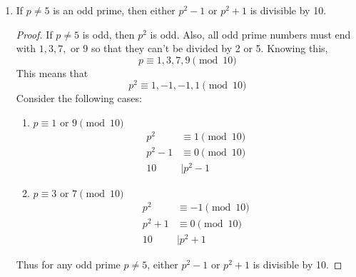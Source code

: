 \documentclass[11pt]{article}
\begin{document}
\begin{enumerate}
\begin{enumerate}
        \item If $p\neq 5$ is an odd prime, then either $p^2-1$ or $p^2 + 1$ is
        divisible by 10.
        \begin{proof}
            If $p\neq 5$ is odd, then $p^2$ is odd. Also, all odd prime numbers must 
            end with $1,3,7,$ or $9$ so that they can't be divided by 2 or 5.
            Knowing this, 
            \[
                p \equiv 1,3,7,9 \pmod{10}
            \]
            This means that
            \[
                p^2 \equiv 1,-1,-1,1 \pmod{10}
            \]
            Consider the following cases:
            \begin{enumerate}
                \item $p\equiv 1 \text{ or }9 \pmod{10}$
                \begin{align*}
                    p^2 &\equiv 1 \pmod{10} \\
                    p^2-1 &\equiv 0 \pmod{10} \\
                    10 &\mid p^2-1
                \end{align*}
                \item $p\equiv 3 \text{ or }7 \pmod{10}$
                \begin{align*}
                    p^2 &\equiv -1 \pmod{10} \\
                    p^2+1 &\equiv 0 \pmod{10} \\
                    10 &\mid p^2+1
                \end{align*}
            \end{enumerate}
            Thus for any odd prime $p\neq 5$, either $p^2-1$ or $p^2 + 1$ is
        divisible by 10.
        \end{proof}

        \end{enumerate}


\end{enumerate}
\end{document}
